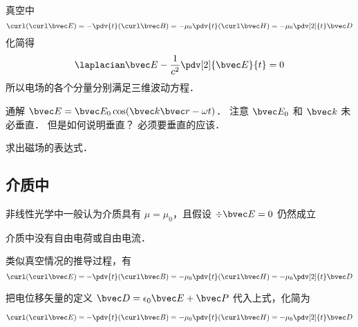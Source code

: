 
\begin{issues}
\issueDraft
\end{issues}


真空中
\begin{equation}
\curl(\curl\bvec E) = -\pdv{t} (\curl\bvec B) = -\mu_0 \pdv{t} (\curl\bvec H)
= -\mu_0 \pdv[2]{t} \bvec D
\end{equation}
化简得
\begin{equation}
\laplacian \bvec E - \frac{1}{c^2} \pdv[2]{\bvec E}{t} = 0
\end{equation}
所以电场的各个分量分别满足三维波动方程．

通解 $\bvec E = \bvec E_0 \cos(\bvec k \bvec r - \omega t)$． 注意 $\bvec E_0$ 和 $\bvec k$ 未必垂直． 但是如何说明垂直？ 必须要垂直的应该．

求出磁场的表达式．

\subsection{介质中}

非线性光学中一般认为介质具有 $\mu = \mu_0$，且假设 $\div\bvec E = 0$ 仍然成立

介质中没有自由电荷或自由电流．

类似真空情况的推导过程，有
\begin{equation}
\curl(\curl\bvec E) = -\pdv{t} (\curl\bvec B) = -\mu_0 \pdv{t} (\curl\bvec H)
= -\mu_0 \pdv[2]{t} \bvec D
\end{equation}

把电位移矢量的定义 $\bvec D = \epsilon_0\bvec E + \bvec P$ 代入上式，化简为

\begin{equation}
\curl(\curl\bvec E) = -\pdv{t} (\curl\bvec B) = -\mu_0 \pdv{t} (\curl\bvec H)
= -\mu_0 \pdv[2]{t} \bvec D
\end{equation}
